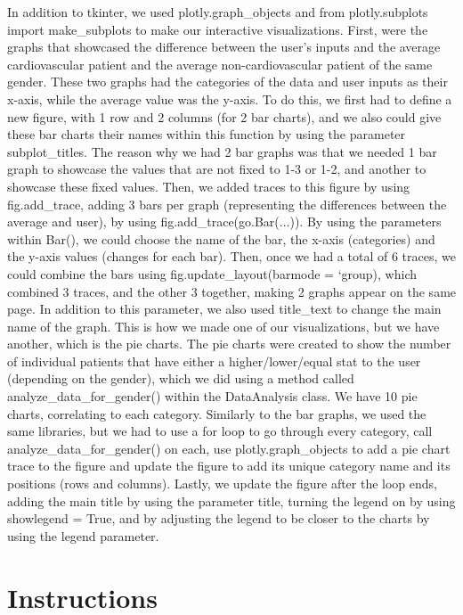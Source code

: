 ﻿\documentclass[12pt]{article}
\begin{document}
In addition to tkinter, we used plotly.graph\_objects and from plotly.subplots import make\_subplots to make our interactive visualizations. First, were the graphs that showcased the difference between the user's inputs and the average cardiovascular patient and the average non-cardiovascular patient of the same gender. These two graphs had the categories of the data and user inputs as their x-axis, while the average value was the y-axis. To do this, we first had to define a new figure, with 1 row and 2 columns (for 2 bar charts), and we also could give these bar charts their names within this function by using the parameter subplot\_titles. The reason why we had 2 bar graphs was that we needed 1 bar graph to showcase the values that are not fixed to 1-3 or 1-2, and another to showcase these fixed values.  Then, we added traces to this figure by using fig.add\_trace, adding 3 bars per graph (representing the differences between the average and user), by using fig.add\_trace(go.Bar(...)). By using the parameters within Bar(), we could choose the name of the bar, the x-axis (categories) and the y-axis values (changes for each bar). Then, once we had a total of 6 traces, we could combine the bars using fig.update\_layout(barmode = ‘group), which combined 3 traces, and the other 3 together, making 2 graphs appear on the same page. In addition to this parameter, we also used title\_text to change the main name of the graph. This is how we made one of our visualizations, but we have another, which is the pie charts. The pie charts were created to show the number of individual patients that have either a higher/lower/equal stat to the user (depending on the gender), which we did using a method called analyze\_data\_for\_gender() within the DataAnalysis class. We have 10 pie charts, correlating to each category. Similarly to the bar graphs, we used the same libraries, but we had to use a for loop to go through every category, call analyze\_data\_for\_gender() on each, use plotly.graph\_objects to add a pie chart trace to the figure and update the figure to add its unique category name and its positions (rows and columns). Lastly, we update the figure after the loop ends, adding the main title by using the parameter title, turning the legend on by using showlegend = True, and by adjusting the legend to be closer to the charts by using the legend parameter.

\section*{Instructions}
\end{document}
